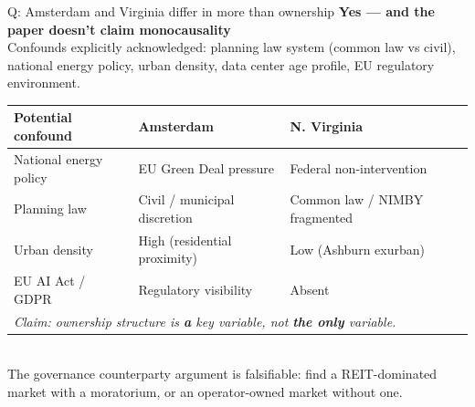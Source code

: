 \documentclass[aspectratio=169,11pt]{beamer}
\begin{document}
\begin{frame}[noframenumbering]{\enspace Q: Amsterdam and Virginia differ in more than ownership}
\small\textbf{Yes — and the paper doesn't claim monocausality}\\[0.4em]
\footnotesize
Confounds explicitly acknowledged: planning law system (common law vs civil), national energy policy, urban density, data center age profile, EU regulatory environment.\\[0.6em]

\begin{tabular}{@{}lll@{}}
\toprule
\textbf{Potential confound} & \textbf{Amsterdam} & \textbf{N. Virginia} \\
\midrule
National energy policy & EU Green Deal pressure & Federal non-intervention \\
Planning law & Civil / municipal discretion & Common law / NIMBY fragmented \\
Urban density & High (residential proximity) & Low (Ashburn exurban) \\
EU AI Act / GDPR & Regulatory visibility & Absent \\
\midrule
\multicolumn{3}{l}{\textit{Claim: ownership structure is \textbf{a} key variable, not \textbf{the only} variable.}} \\
\bottomrule
\end{tabular}\\[0.4em]
\textcolor{dcgray}{The governance counterparty argument is falsifiable: find a REIT-dominated market with a moratorium, or an operator-owned market without one.}
\end{frame}
\end{document}
